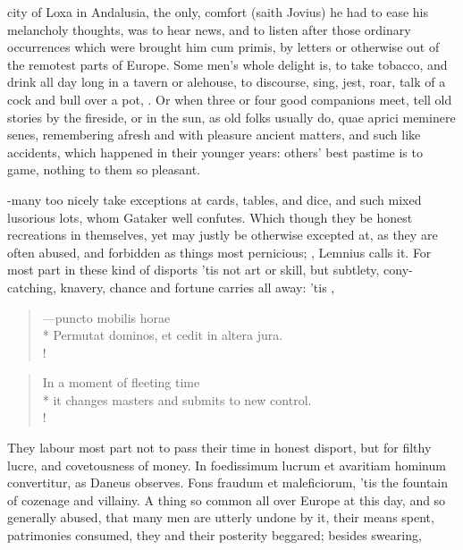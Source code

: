 {city of Loxa in Andalusia, the only, comfort (saith Jovius) he
had to ease his melancholy thoughts, was to hear news, and to listen
after those ordinary occurrences which were brought him cum primis, by
letters or otherwise out of the remotest parts of Europe. Some men's
whole delight is, to take tobacco, and drink all day long in a tavern
or alehouse, to discourse, sing, jest, roar, talk of a cock and bull
over a pot, \etc{}. Or when three or four good companions meet, tell old
stories by the fireside, or in the sun, as old folks usually do, quae
aprici meminere senes, remembering afresh and with pleasure ancient
matters, and such like accidents, which happened in their younger
years: others' best pastime is to game, nothing to them so pleasant.

-many too nicely take exceptions at
cards, tables, and dice, and such
mixed lusorious lots, whom Gataker well confutes. Which though they be honest
recreations in themselves, yet may justly be otherwise excepted at, as
they are often abused, and forbidden as things most pernicious; , Lemnius calls it. For most part in these kind of
disports 'tis not art or skill, but subtlety, cony-catching, knavery,
chance and fortune carries all away: 'tis ,
%
\begin{latin}%
\begin{verse}%
---puncto mobilis horae\\*
Permutat dominos, et cedit in altera jura.\\!
\end{verse}%
\end{latin}%
\translationrule%
\begin{verse}%
In a moment of fleeting time\\*
it changes masters and submits to new control.\\!
\end{verse}%
%
They labour most part not to pass their time in honest disport, but for
filthy lucre, and covetousness of money. In foedissimum lucrum et
avaritiam hominum convertitur, as Daneus observes. Fons fraudum et
maleficiorum, 'tis the fountain of cozenage and villainy. A thing
so common all over Europe at this day, and so generally abused, that
many men are utterly undone by it, their means spent, patrimonies
consumed, they and their posterity beggared; besides swearing,
}
